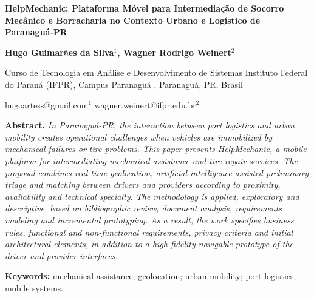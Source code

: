 \documentclass[12pt, a4paper]{article}
\newenvironment{sbcabstract}{%
  \begin{list}{}{%
    \setlength{\leftmargin}{0.8cm}%
    \setlength{\rightmargin}{0.8cm}%
    \setlength{\listparindent}{0cm}%
    \setlength{\itemindent}{0cm}%
    \setlength{\parsep}{0pt}%
  }\item\relax
}{\end{list}}
\begin{document}
\pagestyle{empty}

\begin{center}
    \vspace*{12pt}
    {\fontsize{16pt}{19pt}\bfseries HelpMechanic: Plataforma Móvel para Intermediação de Socorro Mecânico e Borracharia no Contexto Urbano e Logístico de Paranaguá-PR \par}
    
   \vspace{12pt}
    {\fontsize{12pt}{14pt}\bfseries Hugo Guimarães da Silva$^1$, Wagner Rodrigo Weinert$^2$ \par}

    \vspace{12pt}
    {\fontsize{12pt}{14pt} 
    Curso de Tecnologia em Análise e Desenvolvimento de Sistemas
    Instituto Federal do Paraná (IFPR), Campus Paranaguá , Paranaguá, PR, Brasil
    \par}
    
    \vspace{6pt}
    {\fontsize{10pt}{12pt}\ttfamily hugoartess@gmail.com$^1$ wagner.weinert@ifpr.edu.br$^2$ \par}
\end{center}

\vspace{12pt}

\begin{sbcabstract}
\noindent \textbf{Abstract.} \textit{In Paranaguá-PR, the interaction between port logistics and urban mobility creates operational challenges when vehicles are immobilized by mechanical failures or tire problems. This paper presents HelpMechanic, a mobile platform for intermediating mechanical assistance and tire repair services. The proposal combines real-time geolocation, artificial-intelligence-assisted preliminary triage and matching between drivers and providers according to proximity, availability and technical specialty. The methodology is applied, exploratory and descriptive, based on bibliographic review, document analysis, requirements modeling and incremental prototyping. As a result, the work specifies business rules, functional and non-functional requirements, privacy criteria and initial architectural elements, in addition to a high-fidelity navigable prototype of the driver and provider interfaces.}

\vspace{6pt}
\noindent \textbf{Keywords:} mechanical assistance; geolocation; urban mobility; port logistics; mobile systems.
\end{sbcabstract}
\end{document}
